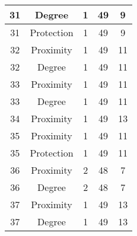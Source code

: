\documentclass[results.tex]{subfiles}
\begin{document}
\begin{center}
\begin{tabular}{| c || c | c | c | c |}
            \hline
            31                      & Degree                       & 1                      & 49                      & 9                    \\
            \hline
            31                      & Protection                   & 1                      & 49                      & 9                    \\
            \hline
            32                      & Proximity                    & 1                      & 49                      & 11                   \\
            \hline
            32                      & Degree                       & 1                      & 49                      & 11                   \\
            \hline
            33                      & Proximity                    & 1                      & 49                      & 11                   \\
            \hline
            33                      & Degree                       & 1                      & 49                      & 11                   \\
            \hline
            34                      & Proximity                    & 1                      & 49                      & 13                   \\
            \hline
            35                      & Proximity                    & 1                      & 49                      & 11                   \\
            \hline
            35                      & Protection                   & 1                      & 49                      & 11                   \\
            \hline
            36                      & Proximity                    & 2                      & 48                      & 7                    \\
            \hline
            36                      & Degree                       & 2                      & 48                      & 7                    \\
            \hline
            37                      & Proximity                    & 1                      & 49                      & 13                   \\
            \hline
            37                      & Degree                       & 1                      & 49                      & 13                   \\

\end{tabular}
\end{center}
\end{document}
